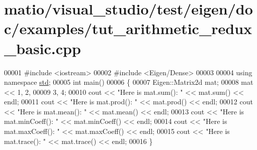 \hypertarget{matio_2visual__studio_2test_2eigen_2doc_2examples_2tut__arithmetic__redux__basic_8cpp_source}{}\section{matio/visual\+\_\+studio/test/eigen/doc/examples/tut\+\_\+arithmetic\+\_\+redux\+\_\+basic.cpp}
\label{matio_2visual__studio_2test_2eigen_2doc_2examples_2tut__arithmetic__redux__basic_8cpp_source}

\begin{DoxyCode}
00001 \textcolor{preprocessor}{#include <iostream>}
00002 \textcolor{preprocessor}{#include <Eigen/Dense>}
00003 
00004 \textcolor{keyword}{using namespace }\hyperlink{namespacestd}{std};
00005 \textcolor{keywordtype}{int} main()
00006 \{
00007   Eigen::Matrix2d mat;
00008   mat << 1, 2,
00009          3, 4;
00010   cout << \textcolor{stringliteral}{"Here is mat.sum():       "} << mat.sum()       << endl;
00011   cout << \textcolor{stringliteral}{"Here is mat.prod():      "} << mat.prod()      << endl;
00012   cout << \textcolor{stringliteral}{"Here is mat.mean():      "} << mat.mean()      << endl;
00013   cout << \textcolor{stringliteral}{"Here is mat.minCoeff():  "} << mat.minCoeff()  << endl;
00014   cout << \textcolor{stringliteral}{"Here is mat.maxCoeff():  "} << mat.maxCoeff()  << endl;
00015   cout << \textcolor{stringliteral}{"Here is mat.trace():     "} << mat.trace()     << endl;
00016 \}
\end{DoxyCode}
